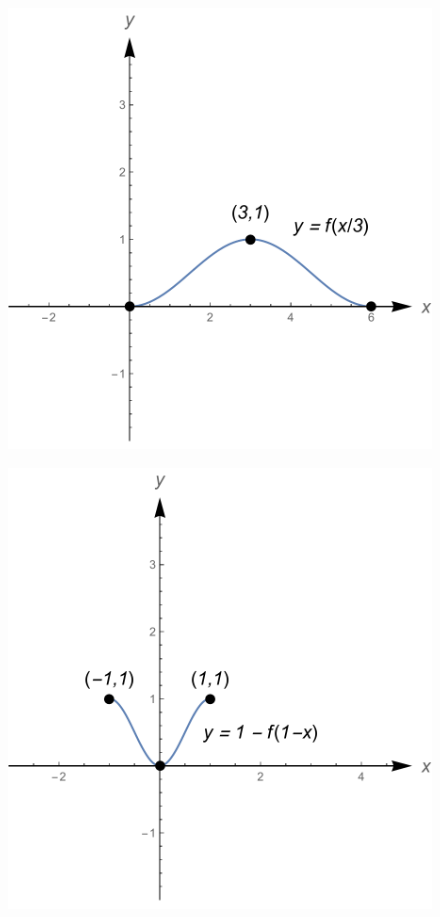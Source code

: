 \begin{Answer}
\begin{figure}[H]
{        \hspace{0.1cm}
        \includegraphics[scale=0.3]{fig_functions_oef_8k}
        }
        \vspace{0.3cm}
        \centerline{
        \includegraphics[scale=0.3]{fig_functions_oef_8l}
}
\end{figure}
\end{Answer}
